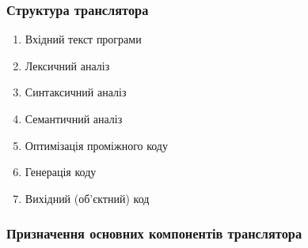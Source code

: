 \subsubsection{Структура транслятора}

\begin{enumerate}
	\item Вхідний текст програми
	\item Лексичний аналіз
	\item Синтаксичний аналіз
	\item Семантичний аналіз
	\item Оптимізація проміжного коду
	\item Генерація коду
	\item Вихідний (об'єктний) код
\end{enumerate}

\subsubsection{Призначення основних компонентів транслятора}

